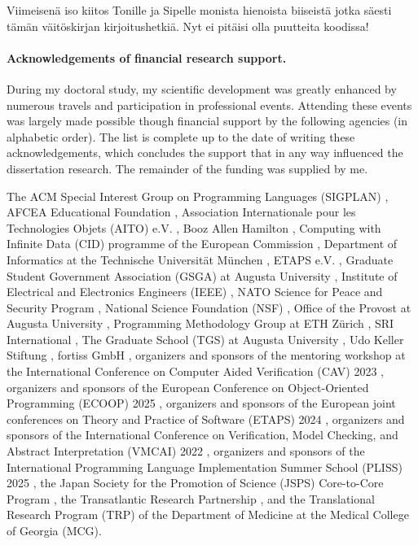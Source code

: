 Viimeisenä iso kiitos Tonille ja Sipelle monista hienoista biiseistä jotka säesti tämän väitöskirjan kirjoitushetkiä.
Nyt ei pitäisi olla puutteita koodissa!

\paragraph*{Acknowledgements of financial research support.}
During my doctoral study, my scientific development was greatly enhanced by numerous travels and participation in professional events.
Attending these events was largely made possible though financial support by the following agencies (in alphabetic order).
The list is complete up to the date of writing these acknowledgements, which concludes the support that in any way influenced the dissertation research.
The remainder of the funding was supplied by me.

The ACM Special Interest Group on Programming Languages (SIGPLAN)%
, AFCEA Educational Foundation%
, Association Internationale pour les Technologies Objets (AITO) e.V.%
, Booz Allen Hamilton%
, Computing with Infinite Data (CID) programme of the European Commission%
, Department of Informatics at the Technische Universität München%
, ETAPS e.V.%
, Graduate Student Government Association (GSGA) at Augusta University%
, Institute of Electrical and Electronics Engineers (IEEE)%
, NATO Science for Peace and Security Program%
, National Science Foundation (NSF)%
, Office of the Provost at Augusta University%
, Programming Methodology Group at ETH Zürich%
, SRI International%
, The Graduate School (TGS) at Augusta University%
, Udo Keller Stiftung%
, fortiss GmbH%
, organizers and sponsors of the mentoring workshop at the International Conference on Computer Aided Verification (CAV) 2023%
, organizers and sponsors of the European Conference on Object-Oriented Programming (ECOOP) 2025%
, organizers and sponsors of the European joint conferences on Theory and Practice of Software (ETAPS) 2024%
, organizers and sponsors of the International Conference on Verification, Model Checking, and Abstract Interpretation (VMCAI) 2022%
, organizers and sponsors of the International Programming Language Implementation Summer School (PLISS) 2025%
, the Japan Society for the Promotion of Science (JSPS) Core-to-Core Program%
, the Transatlantic Research Partnership%
, and the Translational Research Program (TRP) of the Department of Medicine at the Medical College of Georgia (MCG).